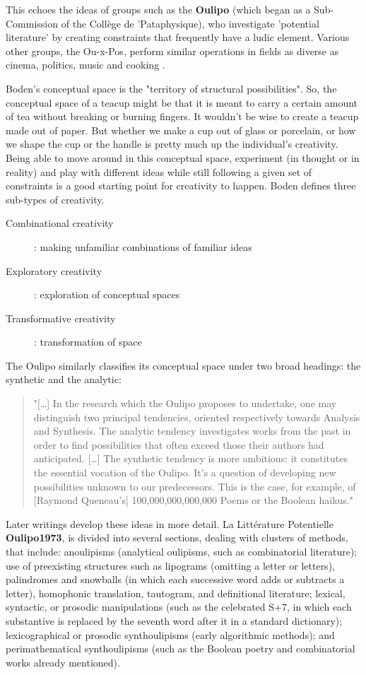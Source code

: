 This echoes the ideas of groups such as the \textbf{Oulipo} (which began as a Sub-Commission of the Collège de 'Pataphysique), who investigate 'potential literature' by creating constraints that frequently have a ludic element. Various other groups, the Ou-x-Pos, perform similar operations in fields as diverse as cinema, politics, music and cooking \citep{Motte2007}.

Boden's conceptual space is the "territory of structural possibilities". So, the conceptual space of a teacup might be that it is meant to carry a certain amount of tea without breaking or burning fingers. It wouldn't be wise to create a teacup made out of paper. But whether we make a cup out of glass or porcelain, or how we shape the cup or the handle is pretty much up the individual's creativity. Being able to move around in this conceptual space, experiment (in thought or in reality) and play with different ideas while still following a given set of constraints is a good starting point for creativity to happen. Boden defines three sub-types of creativity.

\begin{description}
  \item [Combinational creativity]: making unfamiliar combinations of familiar ideas
  \item [Exploratory creativity]: exploration of conceptual spaces
  \item [Transformative creativity]: transformation of space
\end{description}

The Oulipo similarly classifies its conceptual space under two broad headings: the synthetic and the analytic:

\begin{quote}
  "[…] In the research which the Oulipo proposes to undertake, one may distinguish two principal tendencies, oriented respectively towards Analysis and Synthesis. The analytic tendency investigates works from the past in order to find possibilities that often exceed those their authors had anticipated. […] The synthetic tendency is more ambitious: it constitutes the essential vocation of the Oulipo. It's a question of developing new possibilities unknown to our predecessors. This is the case, for example, of [Raymond Queneau's] 100,000,000,000,000 Poems or the Boolean haikus." \citep[p.27]{Motte2007}
\end{quote}

Later writings develop these ideas in more detail. La Littérature Potentielle \textbf{Oulipo1973}, is divided into several sections, dealing with clusters of methods, that include: anoulipisms (analytical oulipisms, such as combinatorial literature); use of preexisting structures such as lipograms (omitting a letter or letters), palindromes and snowballs (in which each successive word adds or subtracts a letter), homophonic translation, tautogram, and definitional literature; lexical, syntactic, or prosodic manipulations (such as the celebrated S+7, in which each substantive is replaced by the seventh word after it in a standard dictionary); lexicographical or prosodic synthoulipisms (early algorithmic methods); and perimathematical synthoulipisms (such as the Boolean poetry and combinatorial works already mentioned).


